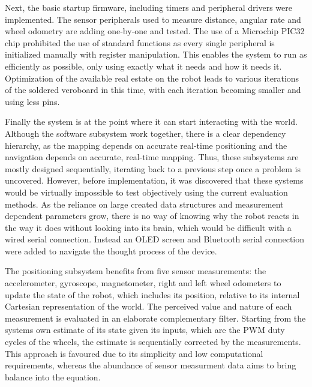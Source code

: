 Next, the basic startup firmware, including timers and peripheral drivers were implemented. The sensor peripherals used to measure distance, angular rate and wheel odometry are adding one-by-one and tested. The use of a Microchip PIC32 chip prohibited the use of standard functions as every single peripheral is initialized manually with register manipulation. This enables the system to run as efficiently as possible, only using exactly what it needs and how it needs it. Optimization of the available real estate on the robot leads to various iterations of the soldered veroboard in this time, with each iteration becoming smaller and using less pins. 

Finally the system is at the point where it can start interacting with the world. Although the software subsystem work together, there is a clear dependency hierarchy, as the mapping depends on accurate real-time positioning and the navigation depends on accurate, real-time mapping. Thus, these subsystems are mostly designed sequentially, iterating back to a previous step once a problem is uncovered. However, before implementation, it was discovered that these systems would be virtually impossible to test objectively using the current evaluation methods. As the reliance on large created data structures and measurement dependent parameters grow, there is no way of knowing why the robot reacts in the way it does without looking into its brain, which would be difficult with a wired serial connection. Instead an OLED screen and Bluetooth serial connection were added to navigate the thought process of the device. 

The positioning subsystem benefits from five sensor measurements: the accelerometer, gyroscope, magnetometer, right and left wheel odometers to update the state of the robot, which includes its position, relative to its internal Cartesian representation of the world. The perceived value and nature of each measurement is evaluated in an elaborate complementary filter. Starting from the systems own estimate of its state given its inputs, which are the PWM duty cycles of the wheels, the estimate is sequentially corrected by the measurements. This approach is favoured due to its simplicity and low computational requirements, whereas the abundance of sensor measurment data aims to bring balance into the equation.

